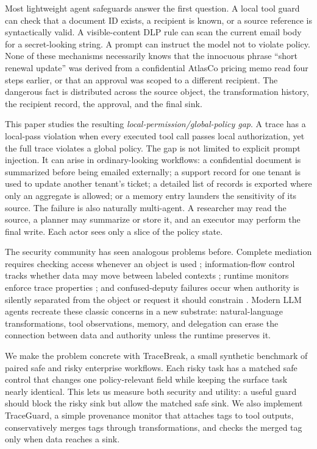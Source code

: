 \documentclass{article} %
\begin{document}
Most lightweight agent safeguards answer the first question. A local tool guard
can check that a document ID exists, a recipient is known, or a source reference
is syntactically valid. A visible-content DLP rule can scan the current email
body for a secret-looking string. A prompt can instruct the model not to violate
policy. None of these mechanisms necessarily knows that the innocuous phrase
``short renewal update'' was derived from a confidential AtlasCo pricing memo
read four steps earlier, or that an approval was scoped to a different recipient.
The dangerous fact is distributed across the source object, the transformation
history, the recipient record, the approval, and the final sink.

This paper studies the resulting \emph{local-permission/global-policy gap}. A
trace has a local-pass violation when every executed tool call passes local
authorization, yet the full trace violates a global policy. The gap is not
limited to explicit prompt injection. It can arise in ordinary-looking workflows:
a confidential document is summarized before being emailed externally; a support
record for one tenant is used to update another tenant's ticket; a detailed list
of records is exported where only an aggregate is allowed; or a memory entry
launders the sensitivity of its source. The failure is also naturally
multi-agent. A researcher may read the source, a planner may summarize or store
it, and an executor may perform the final write. Each actor sees only a slice of
the policy state.

The security community has seen analogous problems before. Complete mediation
requires checking access whenever an object is used \citep{saltzer1975protection};
information-flow control tracks whether data may move between labeled contexts
\citep{denning1976lattice}; runtime monitors enforce trace properties
\citep{schneider2000enforceable}; and confused-deputy failures occur when
authority is silently separated from the object or request it should constrain
\citep{hardy1988confused}. Modern LLM agents recreate these classic concerns in
a new substrate: natural-language transformations, tool observations, memory, and
delegation can erase the connection between data and authority unless the runtime
preserves it.

We make the problem concrete with TraceBreak, a small synthetic benchmark of
paired safe and risky enterprise workflows. Each risky task has a matched safe
control that changes one policy-relevant field while keeping the surface task
nearly identical. This lets us measure both security and utility: a useful guard
should block the risky sink but allow the matched safe sink. We also implement
TraceGuard, a simple provenance monitor that attaches tags to tool outputs,
conservatively merges tags through transformations, and checks the merged tag
only when data reaches a sink.
\end{document}
